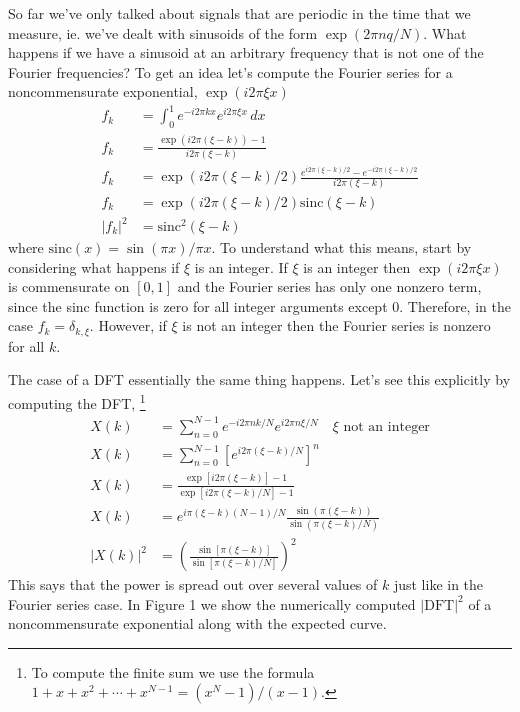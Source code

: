 

So far we've only talked about signals that are periodic in the time that we measure, ie. we've dealt with sinusoids of the form $\exp\left(2\pi nq/N\right)$. What happens if we have a sinusoid at an arbitrary frequency that is not one of the Fourier frequencies? To get an idea let's compute the Fourier series for a noncommensurate exponential, $\exp\left(i2\pi\xi x\right)$
\begin{align*}
f_{k} & = \int_{0}^{1}e^{-i2\pi kx}e^{i2\pi\xi x}\, dx\\
f_{k} & = \frac{\exp\left(i2\pi(\xi-k)\right)-1}{i2\pi(\xi-k)}\\
f_{k} & = \exp\left(i2\pi(\xi-k)/2\right)\frac{e^{i2\pi(\xi-k)/2}-e^{-i2\pi(\xi-k)/2}}{i2\pi(\xi-k)}\\
f_{k} & = \exp\left(i2\pi(\xi-k)/2\right)\textrm{sinc}\left(\xi-k\right)\\
|f_{k}|^{2} & = \textrm{sinc}^{2}\left(\xi-k\right)
\end{align*}
where $\textrm{sinc}(x)=\sin\left(\pi x\right)/\pi x$. To understand what this means, start by considering what happens if $\xi$ is an integer. If $\xi$ is an integer then $\exp\left(i2\pi\xi x\right)$ is commensurate on $[0,1]$ and the Fourier series has only one nonzero term, since the sinc function is zero for all integer arguments except 0. Therefore, in the case $f_{k}=\delta_{k,\xi}$. However, if $\xi$ is not an integer then the Fourier series is nonzero for all $k$.

The case of a DFT essentially the same thing happens. Let's see this explicitly by computing the DFT, \footnote{To compute the finite sum we use the formula $1+x+x^{2}+\cdots+x^{N-1}=(x^{N}-1)/(x-1)$.}
\begin{align*}
X(k) & = \sum_{n=0}^{N-1}e^{-i2\pi nk/N}e^{i2\pi n\xi/N}\quad\xi\textrm{ not an integer}\\
X(k) & = \sum_{n=0}^{N-1}\left[e^{i2\pi(\xi-k)/N}\right]^{n}\\
X(k) & = \frac{\exp\left[i2\pi\left(\xi-k\right)\right]-1}{\exp\left[i2\pi\left(\xi-k\right)/N\right]-1}\\
X(k) & = e^{i\pi(\xi-k)(N-1)/N}\frac{\sin\left(\pi\left(\xi-k\right)\right)}{\sin\left(\pi\left(\xi-k\right)/N\right)}\\
|X(k)|^{2} & = \left(\frac{\sin\left[\pi\left(\xi-k\right)\right]}{\sin\left[\pi\left(\xi-k\right)/N\right]}\right)^{2}
\end{align*}
This says that the power is spread out over several values of $k$ just like in the Fourier series case. In Figure 1 we show the numerically computed $|\textrm{DFT}|^2$ of a noncommensurate exponential along with the expected curve.


